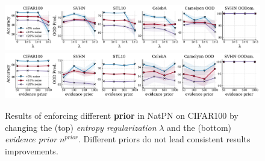 \begin{figure}[!htb]
    \centering
    \includegraphics[width=\textwidth]{sections/008_iclr2023/figures/prior_entropy_acc_pred.pdf}
    \includegraphics[width=\textwidth]{sections/008_iclr2023/figures/prior_pseudo_acc_pred.pdf}
    
    \caption{Results of enforcing different \textbf{prior} in NatPN on CIFAR100 by changing the (top) \textit{entropy regularization} $\lambda$ and the (bottom) \textit{evidence prior} $n^{prior}$. Different priors do not lead consistent results improvements.}
    \label{fig:prior_ood}
\end{figure}
 \vspace{-3mm}

